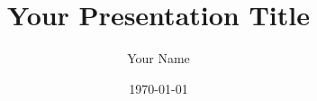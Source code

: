 




\author{Your Name}
\title{Your Presentation Title}
\subject{Your Subject}
\def \vorlesung {Your Course/Seminar Name}
\def \semester {Your Semester/Date}
\def \dozent {Your Professor/Advisor}
\date{\today}
